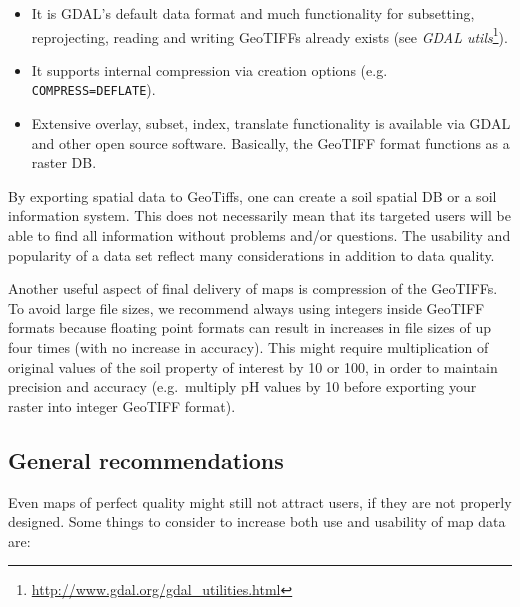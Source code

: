 \documentclass[graybox,natbib,nospthms,UStrade]{svmono}
\renewcommand{\href}[2]{#2 (\url{#1})}
\renewcommand{\href}[2]{#2\footnote{\url{#1}}}
\begin{document}
\begin{itemize}
\item
  It is GDAL's default data format and much functionality for
  subsetting, reprojecting, reading and writing GeoTIFFs already
  exists (see \href{http://www.gdal.org/gdal_utilities.html}{\emph{GDAL
  utils}}).
\item
  It supports internal compression via creation options (e.g.
  \texttt{COMPRESS=DEFLATE}).
\item
  Extensive overlay, subset, index, translate functionality is
  available via GDAL and other open source software. Basically, the
  GeoTIFF format functions as a raster DB.
\end{itemize}

By exporting spatial data to GeoTiffs, one can create a soil spatial DB
or a soil information system. This does not necessarily mean that its
targeted users will be able to find all information without problems
and/or questions. The usability and popularity of a data set reflect
many considerations in addition to data quality.

Another useful aspect of final delivery of maps is compression of the
GeoTIFFs. To avoid large file sizes, we recommend always using integers
inside GeoTIFF formats because floating point formats can result in
increases in file sizes of up four times (with no increase in accuracy).
This might require multiplication of original values of the soil
property of interest by 10 or 100, in order to maintain precision and
accuracy (e.g.~multiply pH values by 10 before exporting your raster
into integer GeoTIFF format).

\hypertarget{general-recommendations}{%
\subsection{General recommendations}\label{general-recommendations}}

Even maps of perfect quality might still not attract users, if they are
not properly designed. Some things to consider to increase both use and
usability of map data are:
\end{document}
